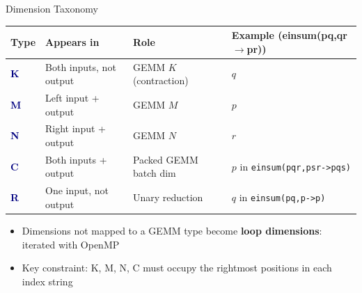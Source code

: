 \documentclass[aspectratio=169,10pt]{beamer}
\newcommand{\einl}[1]{{\footnotesize\texttt{#1}}}
\begin{document}
\begin{frame}{Dimension Taxonomy}

\begin{tabular}{@{}llll@{}}
\toprule
\textbf{Type} & \textbf{Appears in} & \textbf{Role} & \textbf{Example (einsum(pq,qr$\to$pr))} \\
\midrule
\textcolor{Navy}{\bfseries K} & Both inputs, not output & GEMM $K$ (contraction) & $q$ \\
\textcolor{Navy}{\bfseries M} & Left input + output & GEMM $M$ & $p$ \\
\textcolor{Navy}{\bfseries N} & Right input + output & GEMM $N$ & $r$ \\
\textcolor{Navy}{\bfseries C} & Both inputs + output & Packed GEMM batch dim & $p$ in \einl{einsum(pqr,psr->pqs)} \\
\textcolor{Navy}{\bfseries R} & One input, not output & Unary reduction & $q$ in \einl{einsum(pq,p->p)} \\
\bottomrule
\end{tabular}

\bigskip
\begin{itemize}
  \item Dimensions not mapped to a GEMM type become \textbf{loop dimensions}: iterated with OpenMP
  \item Key constraint: K, M, N, C must occupy the \alert{rightmost positions} in each index string
\end{itemize}
\end{frame}
\end{document}
